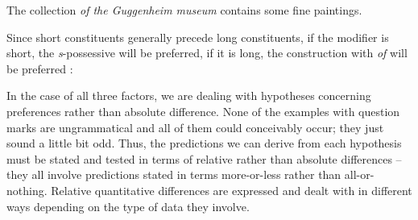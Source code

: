 \begin{description}[leftmargin=*]
\begin{exe}
\ex
\begin{xlist}
\label{ex:sgenanimacy}
\end{xlist}
\ex
\begin{xlist}
\label{ex:ofcanimacy}
\ex The collection \textit{of the Guggenheim museum} contains some fine paintings.
\end{xlist}
\end{exe}

\item[(c) Length]  Since short constituents generally precede long constituents, if the modifier is short, the \textit{s}-possessive  will be preferred, if it is long, the construction with \textit{of} will be preferred \citep{altenberg_binominal_1980}:

\begin{exe}
\ex
\begin{xlist}
\label{ex:sgenlength}
\end{xlist}
\ex
\begin{xlist}
\label{ex:ofclength}
\end{xlist}
\end{exe}
\end{description}

In the case of all three factors, we are dealing with hypotheses  concerning preferences rather than absolute difference. None of the examples with question marks are ungrammatical  and all of them could conceivably occur; they just sound a little bit odd. Thus, the predictions we can derive from each hypothesis must be stated and tested in terms of relative rather than absolute differences -- they all involve predictions stated in terms more\hyp{}or\hyp{}less rather than all\hyp{}or\hyp{}nothing. Relative quantitative  differences are expressed and dealt with in different ways depending on the type of data they involve.

